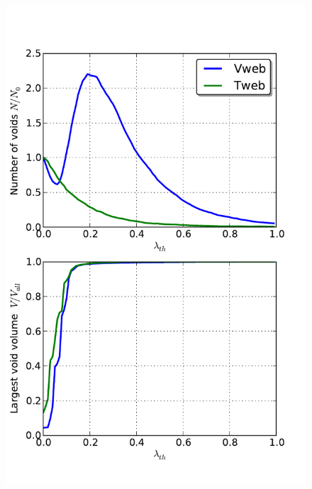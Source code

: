 \documentclass[a4,useAMS,usenatbib,usegraphicx]{latex/mn2e}
\begin{document}
\begin{flushleft}
\begin{figure}
\begin{center}

  \includegraphics[trim = 1mm 10mm 8mm 18mm, clip, keepaspectratio=true,
  width=0.25\textheight]{./figures/voids_regions_percolation.pdf}

\end{center}
\end{figure}
\end{flushleft}
\end{document}
